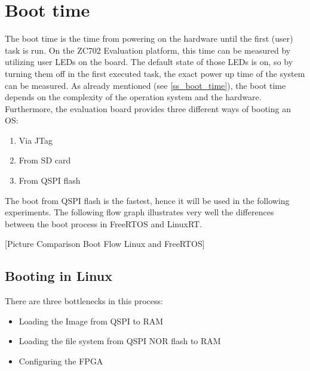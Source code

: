 \section{Boot time}\label{s_boot_time}
The boot time is the time from powering on the hardware until the first (user) task is run. 
On the ZC702 Evaluation platform, this time can be measured by utilizing user \acp{LED} on the board.  
The default state of those LEDs is on, so by turning them off in the first executed task, the exact power up time of the system can be measured.  
As already mentioned (see \ref{ss_boot_time}), the boot time depends on the complexity of the operation system and the hardware. 
Furthermore, the evaluation board provides three different ways of booting an \ac{OS}:
\begin{enumerate}
	\item Via \ac{JTag}
	\item From \ac{SD} card
	\item From \ac{QSPI} flash
\end{enumerate}
The boot from \ac{QSPI} flash is the fastest, hence it will be used in the following experiments.
The following flow graph illustrates very well the differences between the boot process in FreeRTOS and LinuxRT.

[Picture Comparison Boot Flow Linux and FreeRTOS] 

\subsection{Booting in Linux}

There are three bottlenecks in this process:
\begin{itemize}
	\item Loading the Image from \ac{QSPI} to \ac{RAM}
	\item Loading the file system from \ac{QSPI} NOR flash to \ac{RAM}
	\item Configuring the \ac{FPGA}
\end{itemize}

